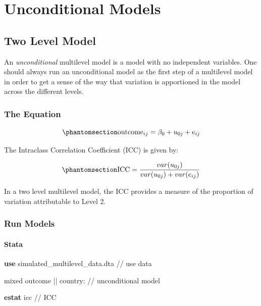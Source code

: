 \documentclass[
  letterpaper,
  DIV=11,
  numbers=noendperiod]{scrreprt}
\newenvironment{Shaded}{\begin{snugshade}}{\end{snugshade}}
\newcommand{\CommentTok}[1]{\textcolor[rgb]{0.37,0.37,0.37}{#1}}
\newcommand{\KeywordTok}[1]{\textcolor[rgb]{0.00,0.23,0.31}{\textbf{#1}}}
\newcommand{\NormalTok}[1]{\textcolor[rgb]{0.00,0.23,0.31}{#1}}
\begin{document}

\chapter{Unconditional Models}\label{unconditional-models}

\section{Two Level Model}\label{two-level-model}

An \emph{unconditional} multilevel model is a model with no independent
variables. One should always run an unconditional model as the first
step of a multilevel model in order to get a sense of the way that
variation is apportioned in the model across the different levels.

\subsection{The Equation}\label{the-equation}

\begin{equation}\phantomsection\label{eq-MLMunconditional}{\text{outcome}_{ij}= \beta_0 + u_{0j} + e_{ij}}\end{equation}

The Intraclass Correlation Coefficient (ICC) is given by:

\begin{equation}\phantomsection\label{eq-ICCunconditional}{\text{ICC} = \frac{var(u_{0j})}{var(u_{0j}) + var(e_{ij})}}\end{equation}

In a two level multilevel model, the ICC provides a measure of the
proportion of variation attributable to Level 2.

\subsection{Run Models}\label{run-models}

\subsubsection{Stata}

\begin{Shaded}
\begin{Highlighting}[]

\KeywordTok{use}\NormalTok{ simulated\_multilevel\_data.dta }\CommentTok{// use data}

\NormalTok{mixed outcome || country:  }\CommentTok{// unconditional model}

\KeywordTok{estat}\NormalTok{ icc }\CommentTok{// ICC}
\end{Highlighting}
\end{Shaded}
\end{document}
